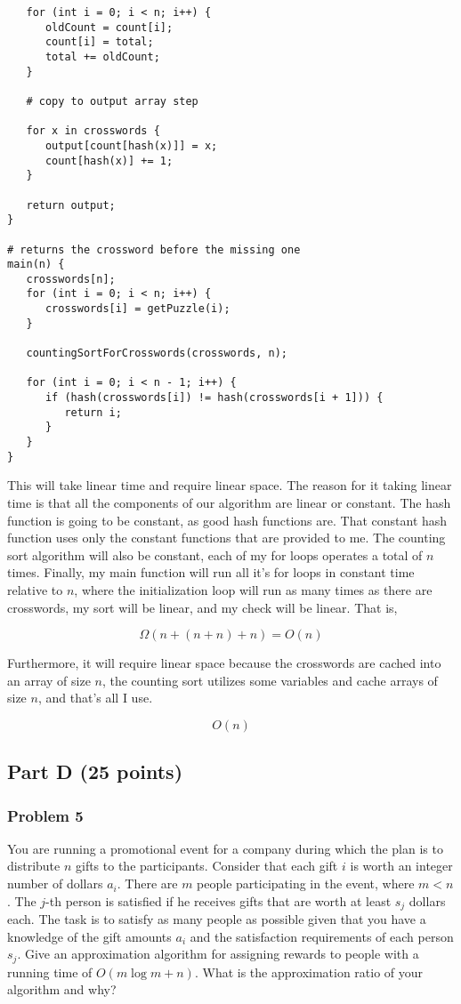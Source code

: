 \documentclass[11pt]{article}
\begin{document}
\begin{verbatim}
   for (int i = 0; i < n; i++) {
      oldCount = count[i];
      count[i] = total;
      total += oldCount;
   }
   
   # copy to output array step
   
   for x in crosswords {
      output[count[hash(x)]] = x;
      count[hash(x)] += 1;
   }
   
   return output;
}

# returns the crossword before the missing one
main(n) {
   crosswords[n];
   for (int i = 0; i < n; i++) {
      crosswords[i] = getPuzzle(i);
   }
   
   countingSortForCrosswords(crosswords, n);
   
   for (int i = 0; i < n - 1; i++) {
      if (hash(crosswords[i]) != hash(crosswords[i + 1])) {
         return i;
      }
   }
}

\end{verbatim}

This will take linear time and require linear space. The reason for it taking
linear time is that all the components of our algorithm are linear or constant.
The hash function is going to be constant, as good hash functions are. That
constant hash function uses only the constant functions that are provided to me.
The counting sort algorithm will also be constant, each of my for loops operates
a total of $n$ times. Finally, my main function will run all it's for loops
in constant time relative to $n$, where the initialization loop will run as many
times as there are crosswords, my sort will be linear, and my check will be linear.
That is,

$$\Omega(n + (n + n) + n) = O(n)$$

Furthermore, it will require linear space because the crosswords are cached
into an array of size $n$, the counting sort utilizes some variables and
cache arrays of size $n$, and that's all I use.

$$O(n)$$

\subsection*{Part D (25 points)}

\subsubsection*{Problem 5} 

You are running a promotional event for a
company during which the plan is to distribute $n$ gifts to the
participants. Consider that each gift $i$ is worth an integer number
of dollars $a_i$. There are $m$ people participating in the event,
where $m < n$. The $j$-th person is satisfied if he receives gifts
that are worth at least $s_j$ dollars each. The task is to satisfy as
many people as possible given that you have a knowledge of the gift
amounts $a_i$ and the satisfaction requirements of each person
$s_j$. Give an approximation algorithm for assigning rewards to people
with a running time of $O(m\log m+n)$. What is the approximation ratio
of your algorithm and why?
\end{document}
